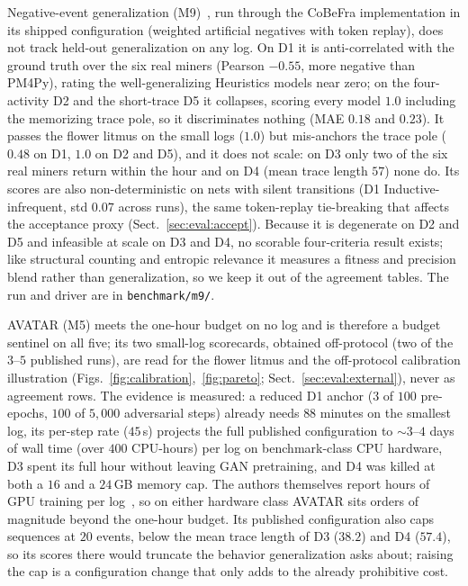 \documentclass[runningheads]{llncs}
\newcommand{\chg}[1]{\textcolor{chgblue}{#1}}
\begin{document}
\chg{Negative-event generalization (M9)~\cite{vandenbroucke2014negative}, run through the CoBeFra implementation in its shipped configuration (weighted artificial negatives with token replay), does not track held-out generalization on any log. On D1 it is anti-correlated with the ground truth over the six real miners (Pearson $-0.55$, more negative than PM4Py), rating the well-generalizing Heuristics models near zero; on the four-activity D2 and the short-trace D5 it collapses, scoring every model $1.0$ including the memorizing trace pole, so it discriminates nothing (MAE $0.18$ and $0.23$). It passes the flower litmus on the small logs ($1.0$) but mis-anchors the trace pole ($0.48$ on D1, $1.0$ on D2 and D5), and it does not scale: on D3 only two of the six real miners return within the hour and on D4 (mean trace length $57$) none do. Its scores are also non-deterministic on nets with silent transitions (D1 Inductive-infrequent, std $0.07$ across runs), the same token-replay tie-breaking that affects the acceptance proxy (Sect.~\ref{sec:eval:accept}). Because it is degenerate on D2 and D5 and infeasible at scale on D3 and D4, no scorable four-criteria result exists; like structural counting and entropic relevance it measures a fitness and precision blend rather than generalization, so we keep it out of the agreement tables. The run and driver are in \texttt{benchmark/m9/}.}

\chg{AVATAR (M5) meets the one-hour budget on no log and is therefore a budget sentinel on all five; its two small-log scorecards, obtained off-protocol (two of the $3$--$5$ published runs), are read for the flower litmus and the off-protocol calibration illustration (Figs.~\ref{fig:calibration},~\ref{fig:pareto}; Sect.~\ref{sec:eval:external}), never as agreement rows. The evidence is measured: a reduced D1 anchor ($3$ of $100$ pre-epochs, $100$ of $5{,}000$ adversarial steps) already needs $88$ minutes on the smallest log, its per-step rate ($45$\,s) projects the full published configuration to ${\sim}3$--$4$ days of wall time (over $400$ CPU-hours) per log on benchmark-class CPU hardware, D3 spent its full hour without leaving GAN pretraining, and D4 was killed at both a $16$ and a $24$\,GB memory cap. The authors themselves report hours of GPU training per log~\cite{theis2020avatar}, so on either hardware class AVATAR sits orders of magnitude beyond the one-hour budget. Its published configuration also caps sequences at $20$ events, below the mean trace length of D3 ($38.2$) and D4 ($57.4$), so its scores there would truncate the behavior generalization asks about; raising the cap is a configuration change that only adds to the already prohibitive cost.}
\end{document}
